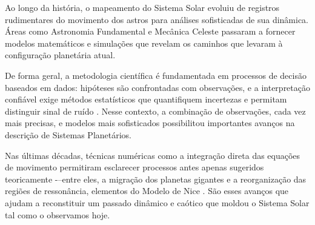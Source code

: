 \documentclass[msc]{on} %
\providecommand{\DIFaddtex}[1]{{\protect\color{red}#1}} %
\providecommand{\DIFaddbegin}{} %
\providecommand{\DIFaddend}{} %
\providecommand{\DIFadd}[1]{\texorpdfstring{\DIFaddtex{#1}}{#1}} %
\begin{document}
Ao longo da história, o mapeamento do Sistema Solar evoluiu de registros rudimentares do movimento dos astros para análises sofisticadas de sua dinâmica. Áreas como Astronomia Fundamental e Mecânica Celeste passaram a fornecer modelos matemáticos e simulações que revelam os caminhos que levaram à configuração planetária atual. 

De forma geral, a metodologia científica é fundamentada em processos de decisão baseados em dados: hipóteses são confrontadas com observações, e a interpretação confiável exige métodos estatísticos que quantifiquem incertezas e permitam distinguir sinal de ruído \citep{Wall2003}. Nesse contexto, a combinação de observações, cada vez mais precisas, e modelos mais sofisticados possibilitou importantes avanços na descrição de Sistemas Planetários.

Nas últimas décadas, técnicas numéricas como a integração direta das equações de movimento permitiram esclarecer processos antes apenas sugeridos teoricamente -\DIFaddbegin \DIFadd{--}\DIFaddend  entre eles, a migração dos planetas gigantes e a reorganização das regiões de ressonância, elementos do Modelo de Nice \citep{Tsiganis2009}. São esses avanços que ajudam a reconstituir um passado dinâmico e caótico que moldou o Sistema Solar tal como o observamos hoje. 
\end{document}
